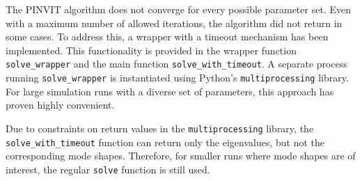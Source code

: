 The PINVIT algorithm does not converge for every possible parameter set. Even with a maximum number of allowed iterations, the algorithm did not return in some cases. To address this, a wrapper with a timeout mechanism has been implemented. This functionality is provided in the wrapper function \texttt{solve\_wrapper} and the main function \texttt{solve\_with\_timeout}. A separate process running \texttt{solve\_wrapper} is instantiated using Python's \texttt{multiprocessing} library. For large simulation runs with a diverse set of parameters, this approach has proven highly convenient.  

Due to constraints on return values in the \texttt{multiprocessing} library, the \texttt{solve\_with\_timeout} function can return only the eigenvalues, but not the corresponding mode shapes. Therefore, for smaller runs where mode shapes are of interest, the regular \texttt{solve} function is still used.\\

\newpage
